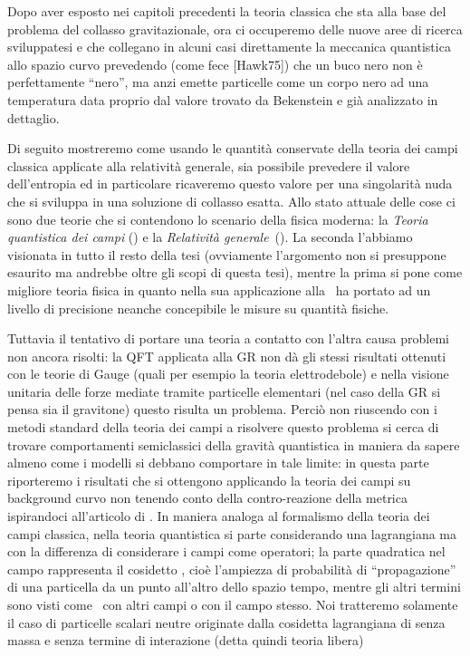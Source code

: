 Dopo aver esposto nei capitoli precedenti la teoria classica che sta alla base del problema del collasso gravitazionale, ora ci occuperemo delle nuove aree di ricerca sviluppatesi e che collegano in alcuni casi direttamente la meccanica quantistica allo spazio curvo prevedendo (come fece [Hawk75]) che un buco nero non \`e perfettamente ``nero'', ma anzi emette particelle come un corpo nero ad una temperatura data proprio dal valore trovato da Bekenstein e gi\`a analizzato in dettaglio.\par
Di seguito mostreremo come usando le quantit\`a conservate della teoria dei campi classica applicate alla relativit\`a generale, sia possibile prevedere il valore dell'entropia ed in particolare ricaveremo questo valore per una singolarit\`a nuda che si sviluppa in una soluzione di collasso esatta.
%
%
%
Allo stato attuale delle cose ci sono due teorie che si contendono lo scenario della fisica moderna: la {\sl Teoria quantistica dei campi} () e la {\sl Relativit\`a generale}\ (). La seconda l'abbiamo visionata in tutto il resto della tesi (ovviamente l'argomento non si presuppone esaurito ma andrebbe oltre gli scopi di questa tesi), mentre la prima si pone come migliore teoria fisica in quanto nella sua applicazione alla \ ha portato ad un livello di precisione neanche concepibile le misure su quantit\`a fisiche.\par
Tuttavia il tentativo di portare una teoria a contatto con l'altra causa problemi non ancora risolti: la QFT applicata alla GR non d\`a gli stessi risultati ottenuti con le teorie di Gauge (quali per esempio la teoria elettrodebole) e nella visione unitaria  delle forze mediate tramite particelle elementari (nel caso della GR si pensa sia il gravitone) questo risulta un problema. Perci\`o non riuscendo con i metodi standard della teoria dei campi a risolvere questo problema si cerca di trovare comportamenti semiclassici della gravit\`a quantistica in maniera da sapere almeno come i modelli si debbano comportare in tale limite: in questa parte riporteremo i risultati che si ottengono applicando la teoria dei campi su background curvo non tenendo conto della contro-reazione della metrica  ispirandoci all'articolo di .
%
%
%
\eject
{}
In maniera analoga al formalismo della teoria dei campi classica, nella teoria quan\-ti\-sti\-ca si parte considerando una lagrangiana  ma con la differenza di considerare i campi come operatori; la parte quadratica nel campo rappresenta il cosidetto , cio\`e l'ampiezza di probabilit\`a di ``propagazione'' di una particella da un punto all'altro dello spazio tempo, mentre gli altri termini sono visti come \ con altri campi o con il campo stesso. Noi tratteremo solamente il  caso di particelle scalari neutre originate dalla  cosidetta lagrangiana di  senza massa e senza termine di interazione (detta quindi teoria libera)
